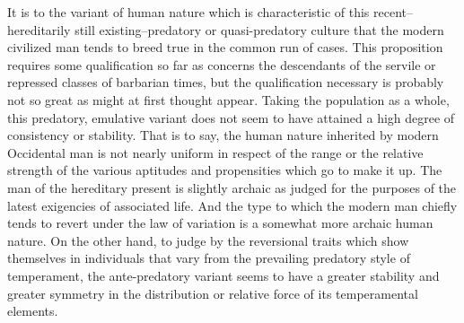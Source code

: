 \documentclass[12pt]{report}
\begin{document}
It is to the variant of human nature which is characteristic of this
recent--hereditarily still existing--predatory or quasi-predatory
culture that the modern civilized man tends to breed true in the common
run of cases. This proposition requires some qualification so far
as concerns the descendants of the servile or repressed classes of
barbarian times, but the qualification necessary is probably not so
great as might at first thought appear. Taking the population as a
whole, this predatory, emulative variant does not seem to have attained
a high degree of consistency or stability. That is to say, the human
nature inherited by modern Occidental man is not nearly uniform in
respect of the range or the relative strength of the various aptitudes
and propensities which go to make it up. The man of the hereditary
present is slightly archaic as judged for the purposes of the latest
exigencies of associated life. And the type to which the modern man
chiefly tends to revert under the law of variation is a somewhat more
archaic human nature. On the other hand, to judge by the reversional
traits which show themselves in individuals that vary from the
prevailing predatory style of temperament, the ante-predatory
variant seems to have a greater stability and greater symmetry in the
distribution or relative force of its temperamental elements.
\end{document}
